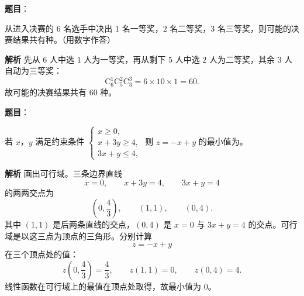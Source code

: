 \begin{answer}

\textbf{题目}：

从进入决赛的 $6$ 名选手中决出 $1$ 名一等奖，$2$ 名二等奖，$3$ 名三等奖，则可能的决赛结果共有\gkblank{}种。（用数字作答）

\textbf{解析}
先从 $6$ 人中选 $1$ 人为一等奖，再从剩下 $5$ 人中选 $2$ 人为二等奖，其余 $3$ 人自动为三等奖：
\nopagebreak[4]
\[\mathrm C_6^1\mathrm C_5^2\mathrm C_3^3
=6\times10\times1=60.\]
故可能的决赛结果共有 $60$ 种。


\end{answer}
\begin{answer}

\textbf{题目}：

若 $x$，$y$ 满足约束条件 $\begin{cases}x\geqslant0,\\ x+3y\geqslant4,\\ 3x+y\leqslant4,\end{cases}$ 则 $z=-x+y$ 的最小值为\gkblank{}。

\textbf{解析}
画出可行域。三条边界直线
\nopagebreak[4]
\[x=0,\qquad x+3y=4,\qquad 3x+y=4\]
的两两交点为
\nopagebreak[4]
\[\left(0,\frac43\right),\qquad(1,1),\qquad(0,4).\]
其中 $(1,1)$ 是后两条直线的交点，$(0,4)$ 是 $x=0$ 与 $3x+y=4$ 的交点。可行域是以这三点为顶点的三角形。分别计算
\nopagebreak[4]
\[z=-x+y\]
在三个顶点处的值：
\nopagebreak[4]
\[z\left(0,\frac43\right)=\frac43,\qquad
z(1,1)=0,\qquad z(0,4)=4.\]
线性函数在可行域上的最值在顶点处取得，故最小值为 $0$。


\end{answer}
